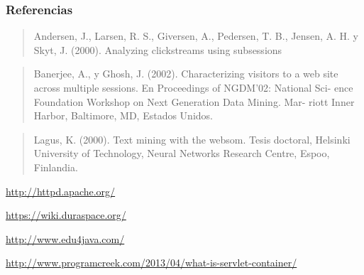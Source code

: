 \documentclass[]{article}
\begin{document}
\subsubsection{Referencias}\label{referencias}

\begin{quote}
Andersen, J., Larsen, R. S., Giversen, A., Pedersen, T. B., Jensen, A.
H. y Skyt, J. (2000). Analyzing clickstreams using subsessions
\end{quote}

\begin{quote}
Banerjee, A., y Ghosh, J. (2002). Characterizing visitors to a web site
across multiple sessions. En Proceedings of NGDM'02: National Sci- ence
Foundation Workshop on Next Generation Data Mining. Mar- riott Inner
Harbor, Baltimore, MD, Estados Unidos.
\end{quote}

\begin{quote}
Lagus, K. (2000). Text mining with the websom. Tesis doctoral, Helsinki
University of Technology, Neural Networks Research Centre, Espoo,
Finlandia.
\end{quote}

\url{http://httpd.apache.org/}

\url{https://wiki.duraspace.org/}

\url{http://www.edu4java.com/}

\url{http://www.programcreek.com/2013/04/what-is-servlet-container/}
\end{document}
